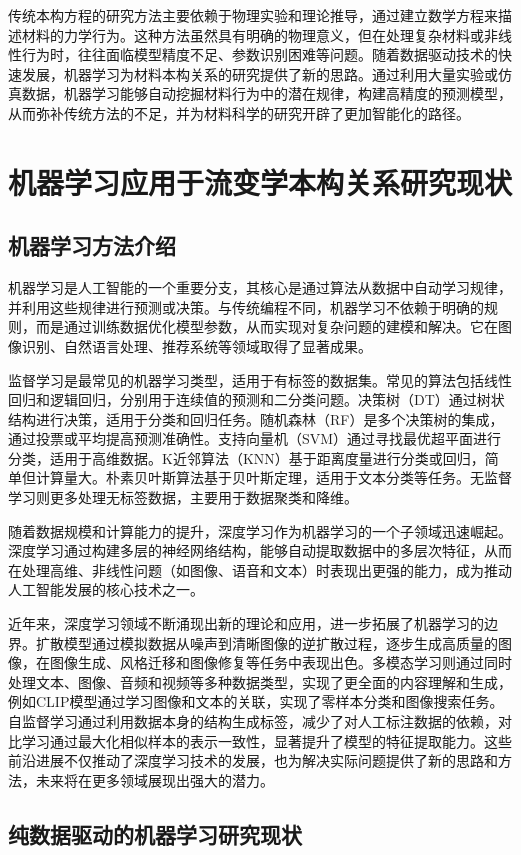 传统本构方程的研究方法主要依赖于物理实验和理论推导，通过建立数学方程来描述材料的力学行为。这种方法虽然具有明确的物理意义，但在处理复杂材料或非线性行为时，往往面临模型精度不足、参数识别困难等问题。随着数据驱动技术的快速发展，机器学习为材料本构关系的研究提供了新的思路。通过利用大量实验或仿真数据，机器学习能够自动挖掘材料行为中的潜在规律，构建高精度的预测模型，从而弥补传统方法的不足，并为材料科学的研究开辟了更加智能化的路径。
\section{机器学习应用于流变学本构关系研究现状}
\subsection{机器学习方法介绍}
机器学习是人工智能的一个重要分支，其核心是通过算法从数据中自动学习规律，并利用这些规律进行预测或决策。与传统编程不同，机器学习不依赖于明确的规则，而是通过训练数据优化模型参数，从而实现对复杂问题的建模和解决。它在图像识别、自然语言处理、推荐系统等领域取得了显著成果。

监督学习是最常见的机器学习类型，适用于有标签的数据集。常见的算法包括线性回归和逻辑回归，分别用于连续值的预测和二分类问题。决策树（DT）通过树状结构进行决策，适用于分类和回归任务。随机森林（RF）是多个决策树的集成，通过投票或平均提高预测准确性。支持向量机（SVM）通过寻找最优超平面进行分类，适用于高维数据。K近邻算法（KNN）基于距离度量进行分类或回归，简单但计算量大。朴素贝叶斯算法基于贝叶斯定理，适用于文本分类等任务。无监督学习则更多处理无标签数据，主要用于数据聚类和降维。

随着数据规模和计算能力的提升，深度学习作为机器学习的一个子领域迅速崛起。深度学习通过构建多层的神经网络结构，能够自动提取数据中的多层次特征，从而在处理高维、非线性问题（如图像、语音和文本）时表现出更强的能力，成为推动人工智能发展的核心技术之一。

近年来，深度学习领域不断涌现出新的理论和应用，进一步拓展了机器学习的边界。扩散模型通过模拟数据从噪声到清晰图像的逆扩散过程，逐步生成高质量的图像，在图像生成、风格迁移和图像修复等任务中表现出色。多模态学习则通过同时处理文本、图像、音频和视频等多种数据类型，实现了更全面的内容理解和生成，例如CLIP模型通过学习图像和文本的关联，实现了零样本分类和图像搜索任务。自监督学习通过利用数据本身的结构生成标签，减少了对人工标注数据的依赖，对比学习通过最大化相似样本的表示一致性，显著提升了模型的特征提取能力。这些前沿进展不仅推动了深度学习技术的发展，也为解决实际问题提供了新的思路和方法，未来将在更多领域展现出强大的潜力。

\subsection{纯数据驱动的机器学习研究现状}
